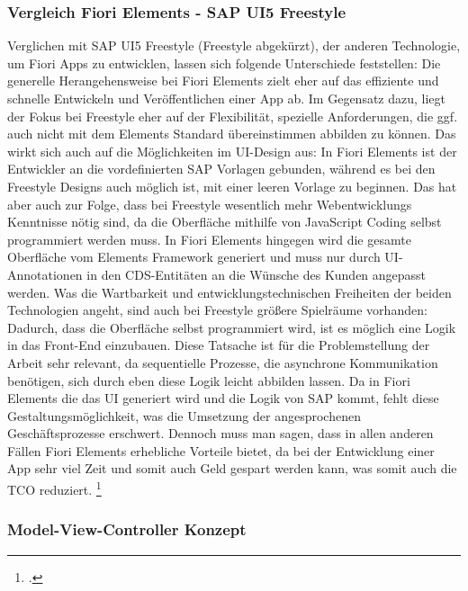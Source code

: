 \subsubsection{Vergleich Fiori Elements - SAP UI5 Freestyle}

Verglichen mit SAP UI5 Freestyle (Freestyle abgekürzt), der anderen Technologie, um Fiori Apps zu entwicklen, lassen sich folgende Unterschiede feststellen: Die generelle Herangehensweise bei Fiori Elements zielt eher auf das effiziente und schnelle Entwickeln und Veröffentlichen einer App ab. Im Gegensatz dazu, liegt der Fokus bei Freestyle eher auf der Flexibilität, spezielle Anforderungen, die ggf. auch nicht mit dem Elements Standard übereinstimmen abbilden zu können. Das wirkt sich auch auf die Möglichkeiten im UI-Design aus: In Fiori Elements ist der Entwickler an die vordefinierten SAP Vorlagen gebunden, während es bei den Freestyle Designs auch möglich ist, mit einer leeren Vorlage zu beginnen. Das hat aber auch zur Folge, dass bei Freestyle wesentlich mehr Webentwicklungs Kenntnisse nötig sind, da die Oberfläche mithilfe von JavaScript Coding selbst programmiert werden muss. In Fiori Elements hingegen wird die gesamte Oberfläche vom Elements Framework generiert und muss nur durch UI-Annotationen in den CDS-Entitäten an die Wünsche des Kunden angepasst werden. Was die Wartbarkeit und entwicklungstechnischen Freiheiten der beiden Technologien angeht, sind auch bei Freestyle grö{\ss}ere Spielräume vorhanden: Dadurch, dass die Oberfläche selbst programmiert wird, ist es möglich eine Logik in das Front-End einzubauen. Diese Tatsache ist für die Problemstellung der Arbeit sehr relevant, da sequentielle Prozesse, die asynchrone Kommunikation benötigen, sich durch eben diese Logik leicht abbilden lassen. Da in Fiori Elements die das UI generiert wird und die Logik von SAP kommt, fehlt diese Gestaltungsmöglichkeit, was die Umsetzung der angesprochenen Geschäftsprozesse erschwert. Dennoch muss man sagen, dass in allen anderen Fällen Fiori Elements erhebliche Vorteile bietet, da bei der Entwicklung einer App sehr viel Zeit und somit auch Geld gespart werden kann, was somit auch die TCO reduziert. \footcite[Vgl.][]{sap_ui5-freestyle-elements-image_2023}

\subsubsection{Model-View-Controller Konzept}

